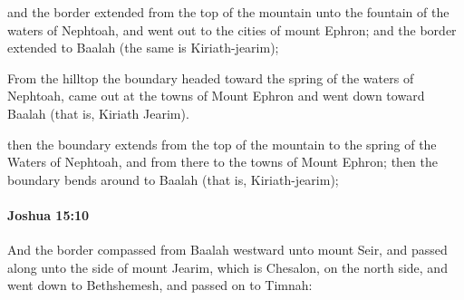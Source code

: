 			\begin{versebox}
					\item[BHS] 
					\item[ASV] and the border extended from the top of the mountain unto the fountain of the waters of Nephtoah, and went out to the cities of mount Ephron; and the border extended to Baalah (the same is Kiriath-jearim);
					\item[NIV] From the hilltop the boundary headed toward the spring of the waters of Nephtoah, came out at the towns of Mount Ephron and went down toward Baalah (that is, Kiriath Jearim).
					\item[NRSV] then the boundary extends from the top of the mountain to the spring of the Waters of Nephtoah, and from there to the towns of Mount Ephron; then the boundary bends around to Baalah (that is, Kiriath-jearim);
			\end{versebox}

		\paragraph{Joshua 15:10} %
			\label{JOSHUA-15-10}

			And the border compassed from Baalah westward unto mount Seir, and passed along unto the side of mount Jearim, which is Chesalon, on the north side, and went down to Bethshemesh, and passed on to Timnah:

